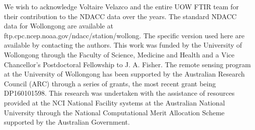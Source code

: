 \documentclass[draft,linenumbers]{AGUJournal}
\begin{document}
%
%
%
%
%
%
%


\acknowledgments
We wish to acknowledge Voltaire Velazco and the entire UOW FTIR team for their contribution to the NDACC data over the years. The standard NDACC data for Wollongong are available at ftp.cpc.ncep.noaa.gov/ndacc/station/wollong. The specific version used here are available by contacting the authors. This work was funded by the University of Wollongong through the Faculty of Science, Medicine and Health and a Vice Chancellor's Postdoctoral Fellowship to J. A. Fisher. The remote sensing program at the University of Wollongong has been supported by the Australian Research Council (ARC) through a series of grants, the most recent grant being DP160101598. This research was undertaken with the assistance of resources provided at the NCI National Facility systems at the Australian National University through the National Computational Merit Allocation Scheme supported by the Australian Government.







\end{document}
